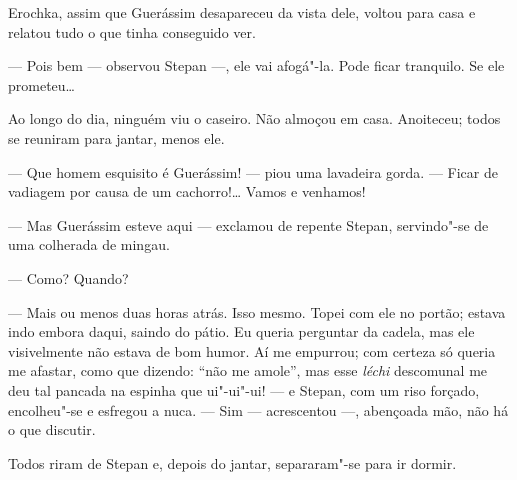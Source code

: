 Erochka, assim que Guerássim desapareceu da vista dele, voltou para casa
e relatou tudo o que tinha conseguido ver.

--- Pois bem --- observou Stepan ---, ele vai afogá"-la. Pode ficar
tranquilo. Se ele prometeu\ldots{}

Ao longo do dia, ninguém viu o caseiro. Não almoçou em casa. Anoiteceu;
todos se reuniram para jantar, menos ele.

--- Que homem esquisito é Guerássim! --- piou uma lavadeira gorda. ---
Ficar de vadiagem por causa de um cachorro!\ldots{} Vamos e venhamos!

--- Mas Guerássim esteve aqui --- exclamou de repente Stepan,
servindo"-se de uma colherada de mingau.

--- Como? Quando?

--- Mais ou menos duas horas atrás. Isso mesmo. Topei com ele no portão;
estava indo embora daqui, saindo do pátio. Eu queria perguntar da
cadela, mas ele visivelmente não estava de bom humor. Aí me empurrou;
com certeza só queria me afastar, como que dizendo: ``não me amole'',
mas esse \emph{léchi} descomunal me deu tal pancada na espinha que
ui"-ui"-ui! --- e Stepan, com um riso forçado, encolheu"-se e esfregou a
nuca. --- Sim --- acrescentou ---, abençoada mão, não há o que discutir.

Todos riram de Stepan e, depois do jantar, separaram"-se para ir dormir.

